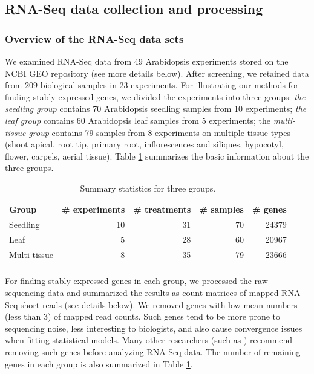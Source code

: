 \documentclass[letterpaper,12pt]{article}
\begin{document}
\subsection{RNA-Seq data collection and processing}\label{section:DataCollection} 

\subsubsection*{Overview of the RNA-Seq data sets}
We examined RNA-Seq data from 49 Arabidopsis experiments stored on the NCBI
GEO repository (see more details below). After screening, we retained data
from 209 biological samples in 23 experiments.  For illustrating our methods
for finding stably expressed genes, we divided the experiments into three
groups: \textit{the seedling group} contains  70 Arabidopsis seedling samples
from 10 experiments; \textit{ the leaf group} contains 60 Arabidopsis leaf
samples from 5 experiments;  the \textit{multi-tissue group} contains 79
samples from 8 experiments on multiple tissue types (shoot apical, root tip,
primary root, inflorescences and siliques, hypocotyl, flower, carpels, aerial
tissue).  Table \ref{table:TableSet3} summarizes the basic information about
the three groups.
\begin{table}[h]
    \centering
    \caption{Summary statistics for three groups.}
    \begin{tabular}{lrrrr} \hline
	Group & \#  experiments & \# treatments  & \# samples & \# genes \\ \hline
	Seedling &10 & 31 &70  &24379  \\
	Leaf &5 & 28 & 60 &20967  \\
	Multi-tissue &8 &35  &79  & 23666\\ \hline
	\label{table:TableSet3}
    \end{tabular}
\end{table}

For finding stably expressed genes in each group, we processed the raw
sequencing data and summarized the results as count matrices of mapped RNA-Seq
short reads (see details below).  We removed genes with low mean numbers (less
than 3) of mapped read counts.  Such genes tend to be more prone to sequencing
noise, less interesting to biologists, and also cause convergence issues when
fitting statistical models. Many other researchers (such as \citealt{anders2013count})
recommend removing such genes before analyzing RNA-Seq data.  The number of
remaining genes in each group is also summarized in Table
\ref{table:TableSet3}.
\end{document}

